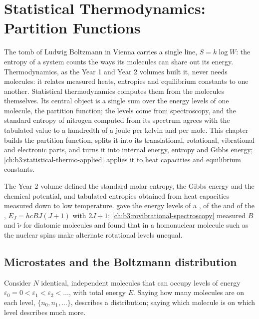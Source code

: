 \chapter{Statistical Thermodynamics: Partition Functions}\label{ch:b3:partition-functions}

The tomb of Ludwig Boltzmann in Vienna carries a single line, $S = k\log W$: the
entropy of a system counts the ways its molecules can share out its energy.
Thermodynamics, as the Year 1 and Year 2 volumes built it, never needs
molecules: it relates measured heats, entropies and equilibrium constants to
one another. Statistical thermodynamics computes them from the molecules
themselves. Its central object is a single sum over the energy levels of one
molecule, the partition function; the levels come from spectroscopy, and the
standard entropy of nitrogen computed from its spectrum agrees with the
tabulated value to a hundredth of a joule per kelvin and per mole. This chapter
builds the partition function, splits it into its translational, rotational,
vibrational and electronic parts, and turns it into internal energy, entropy
and Gibbs energy; \cref{ch:b3:statistical-thermo-applied} applies it to heat
capacities and equilibrium constants.

\begin{recall}
The Year 2 volume defined the standard molar entropy, the Gibbs energy and the
chemical potential, and tabulated entropies obtained from heat capacities
measured down to low temperature.  gave the
energy levels of a , of the  and of the
, $E_J = hcBJ(J+1)$ with  $2J + 1$;
\cref{ch:b3:rovibrational-spectroscopy} measured $B$ and $\tilde\nu$ for diatomic
molecules and found that in a homonuclear molecule such as  the
nuclear spins make alternate rotational levels unequal.
\end{recall}

\section{Microstates and the Boltzmann distribution}

Consider $N$ identical, independent molecules that can occupy levels of energy
$\varepsilon_0 = 0 < \varepsilon_1 < \varepsilon_2 < \dots$, with total energy $E$. Saying how many
molecules are on each level, $\{n_0, n_1, \dots\}$, describes a distribution;
saying which molecule is on which level describes much more.

